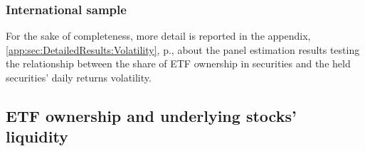 

\begin{landscape}
  {\linespread{1.0}
    
  }
\end{landscape}

\subsubsection{International sample}

For the sake of completeness, more detail is reported in the appendix, \autoref{app:sec:DetailedResults:Volatility}, p.\pageref{app:sec:DetailedResults:Volatility}, about the panel estimation results testing the relationship between the share of ETF ownership in securities and the held securities' daily returns volatility. 

\subsection{ETF ownership and underlying stocks' liquidity}
\label{sec:Results:sub:Liquidity}
